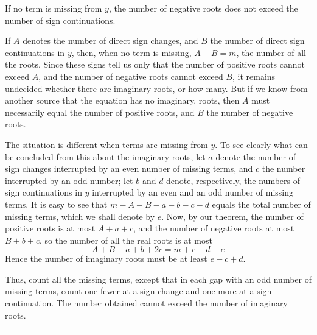 If no term is missing from $y$, the number of negative roots does not exceed the number of sign continuations.

If $A$ denotes the number of direct sign changes, and $B$ the number of direct sign continuations in $y$, then, when no term is missing, $A+B=m$, the number of all the roots. Since these signs tell us only that the number of positive roots cannot exceed $A$, and the number of negative roots cannot exceed $B$, it remains undecided whether there are imaginary roots, or how many. But if we know from another source that the equation has no imaginary. roots, then $A$ must necessarily equal the number of positive roots, and $B$ the number of negative roots.

The situation is different when terms are missing from $y$. To see clearly
what can be concluded from this about the imaginary roots, let $a$ denote the number of sign changes interrupted by an even number of missing terms, and $c$ the number interrupted by an odd number; let $b$ and $d$ denote, respectively, the numbers of sign continuations in $y$ interrupted by an even and an odd number of missing terms. It is easy to see that $m-A-B-a-b-c-d$ equals the total number of missing terms, which we shall denote by $e$. Now, by our theorem, the number of positive roots is at most $A+a+c$, and the number of negative roots at most $B+b+c$, so the number of all the real roots is at most
\[
A+B+a+b+2c=m+c-d-e
\]
Hence the number of imaginary roots must be at least $e-c+d$.

Thus, count all the missing terms, except that in each gap with an odd number of missing terms, count one fewer at a sign change and one more at a sign continuation. The number obtained cannot exceed the number of imaginary roots.
\begin{center}\rule{0.28\linewidth}{0.4pt}\end{center}
